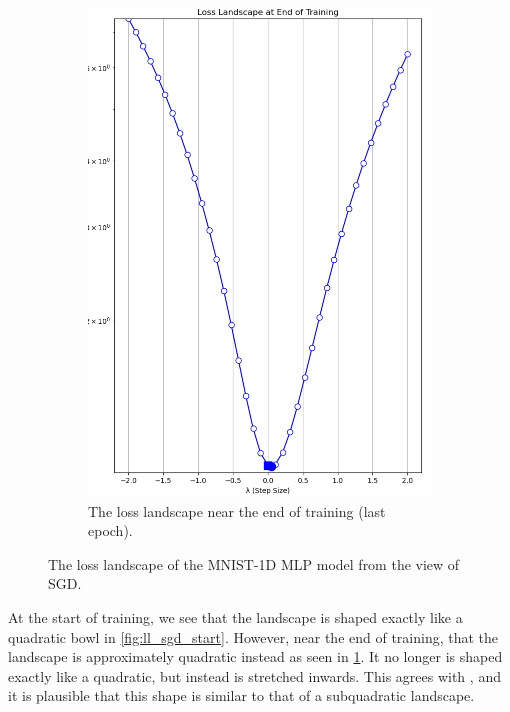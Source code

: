 \begin{figure}[!t]
\begin{subfigure}[b]{0.49\linewidth}
        \centering
        \includegraphics[width=\linewidth, height=0.4\textheight]{figures/5evals/ll_sgd_end.png}
        \caption{The loss landscape near the end of training (last epoch).}
        \label{fig:ll_sgd_end}
    \end{subfigure}
    \caption{The loss landscape of the MNIST-1D MLP model from the view of SGD.}
    \label{fig:ll_landscape}
\end{figure}

At the start of training, we see that the landscape is shaped exactly like a quadratic bowl in \cref{fig:ll_sgd_start}. However, near the end of training, that the landscape is approximately quadratic instead as seen in \cref{fig:ll_sgd_end}. It no longer is shaped exactly like a quadratic, but instead is stretched inwards. This agrees with \cite{ma2022beyond}, and it is plausible that this shape is similar to that of a subquadratic landscape.

